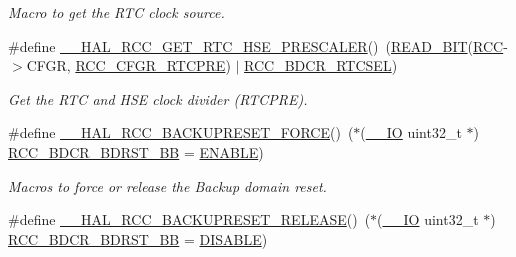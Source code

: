 \begin{DoxyCompactItemize}
\begin{DoxyCompactList}\small\item\em Macro to get the R\+TC clock source. \end{DoxyCompactList}\item 
\#define \hyperlink{group___r_c_c___internal___r_t_c___clock___configuration_ga85dc62f0fcb14981c47d7f7da25e26d6}{\+\_\+\+\_\+\+H\+A\+L\+\_\+\+R\+C\+C\+\_\+\+G\+E\+T\+\_\+\+R\+T\+C\+\_\+\+H\+S\+E\+\_\+\+P\+R\+E\+S\+C\+A\+L\+ER}()~(\hyperlink{group___exported__macro_ga822bb1bb9710d5f2fa6396b84e583c33}{R\+E\+A\+D\+\_\+\+B\+IT}(\hyperlink{group___peripheral__declaration_ga74944438a086975793d26ae48d5882d4}{R\+CC}-\/$>$C\+F\+GR, \hyperlink{group___peripheral___registers___bits___definition_gad7c067c52ecd135252c691aad32c0b83}{R\+C\+C\+\_\+\+C\+F\+G\+R\+\_\+\+R\+T\+C\+P\+RE}) $\vert$ \hyperlink{group___peripheral___registers___bits___definition_gabe30dbd38f6456990ee641648bc05d40}{R\+C\+C\+\_\+\+B\+D\+C\+R\+\_\+\+R\+T\+C\+S\+EL})
\begin{DoxyCompactList}\small\item\em Get the R\+TC and H\+SE clock divider (R\+T\+C\+P\+RE). \end{DoxyCompactList}\item 
\#define \hyperlink{group___r_c_c___internal___r_t_c___clock___configuration_ga3bf7da608ff985873ca8e248fb1dc4f0}{\+\_\+\+\_\+\+H\+A\+L\+\_\+\+R\+C\+C\+\_\+\+B\+A\+C\+K\+U\+P\+R\+E\+S\+E\+T\+\_\+\+F\+O\+R\+CE}()~($\ast$(\hyperlink{core__sc300_8h_aec43007d9998a0a0e01faede4133d6be}{\+\_\+\+\_\+\+IO} uint32\+\_\+t $\ast$) \hyperlink{group___r_c_c___bit_address___alias_region_ga5e5805d3c5b9ad3ebc13e030e5fdd86c}{R\+C\+C\+\_\+\+B\+D\+C\+R\+\_\+\+B\+D\+R\+S\+T\+\_\+\+BB} = \hyperlink{group___exported__types_ggac9a7e9a35d2513ec15c3b537aaa4fba1a7d46875fa3ebd2c34d2756950eda83bf}{E\+N\+A\+B\+LE})
\begin{DoxyCompactList}\small\item\em Macros to force or release the Backup domain reset. \end{DoxyCompactList}\item 
\#define \hyperlink{group___r_c_c___internal___r_t_c___clock___configuration_ga14f32622c65f4ae239ba8cb00d510321}{\+\_\+\+\_\+\+H\+A\+L\+\_\+\+R\+C\+C\+\_\+\+B\+A\+C\+K\+U\+P\+R\+E\+S\+E\+T\+\_\+\+R\+E\+L\+E\+A\+SE}()~($\ast$(\hyperlink{core__sc300_8h_aec43007d9998a0a0e01faede4133d6be}{\+\_\+\+\_\+\+IO} uint32\+\_\+t $\ast$) \hyperlink{group___r_c_c___bit_address___alias_region_ga5e5805d3c5b9ad3ebc13e030e5fdd86c}{R\+C\+C\+\_\+\+B\+D\+C\+R\+\_\+\+B\+D\+R\+S\+T\+\_\+\+BB} = \hyperlink{group___exported__types_ggac9a7e9a35d2513ec15c3b537aaa4fba1ad3a9df141be0ccf10389b640f492b26d}{D\+I\+S\+A\+B\+LE})
\end{DoxyCompactItemize}


